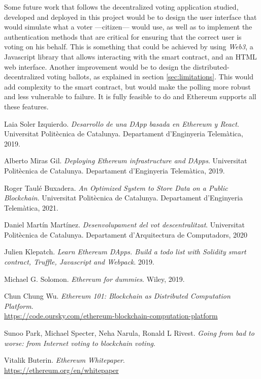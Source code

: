 \documentclass[10pt]{article}
\begin{document}
\begin{multicols}{2}
Some future work that follows the decentralized voting application studied, developed and deployed in this project would be to design the user interface that would simulate what a voter ---citizen--- would use, as well as to implement the authentication methods that are critical for ensuring that the correct user is voting on his behalf. This is something that could be achieved by using \textit{Web3}, a Javascript library that allows interacting with the smart contract, and an HTML web interface. Another improvement would be to design the distributed-decentralized voting ballots, as explained in section \ref{sec:limitations}. This would add complexity to the smart contract, but would make the polling more robust and less vulnerable to failure. It is fully feasible to do and Ethereum supports all these features.

\begin{thebibliography}{100}


Laia Soler Izquierdo. 
\textit{Desarrollo de una DApp basada en Ethereum y React}. 
Universitat Politècnica de Catalunya. Departament d'Enginyeria Telemàtica, 2019.

Alberto Miras Gil. 
\textit{Deploying Ethereum infrastructure and DApps}. 
Universitat Politècnica de Catalunya. Departament d'Enginyeria Telemàtica, 2019.

Roger Taulé Buxadera. 
\textit{An Optimized System to Store Data on a Public Blockchain}. 
Universitat Politècnica de Catalunya. Departament d'Enginyeria Telemàtica, 2021.

Daniel Martín Martínez. 
\textit{Desenvolupament del vot descentralitzat}. 
Universitat Politècnica de Catalunya. Departament d'Arquitectura de Computadors, 2020

Julien Klepatch. 
\textit{Learn Ethereum DApps. Build a todo list with Solidity smart contract, Truffle, Javascript and Webpack}.
2019.

Michael G. Solomon. 
\textit{Ethereum for dummies}.
Wiley, 2019.

Chun Chung Wu. 
\textit{Ethereum 101: Blockchain as Distributed Computation Platform}.
{\small \\\url{https://code.oursky.com/ethereum-blockchain-computation-platform}}

Sunoo Park, Michael Specter, Neha Narula, Ronald L Rivest. 
\textit{Going from bad to worse: from Internet voting to blockchain voting}.

Vitalik Buterin. 
\textit{Ethereum Whitepaper}.
{\small \\\url{https://ethereum.org/en/whitepaper}}

\end{thebibliography}

\end{multicols}
\end{document}
